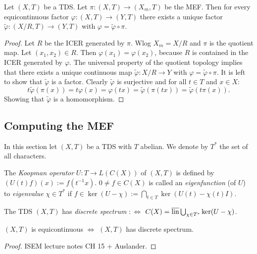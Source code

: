 \begin{proposition}
  Let $(X,T)$ be a TDS. Let $\pi : (X, T) \to  (X_m,T)$ be the MEF.
  Then for every equicontinuous factor $\varphi : (X,T) \to (Y,T)$ there exists a unique factor $\tilde{\varphi}: (X/R,T) \to (Y,T)$ with $\varphi = \tilde{\varphi} \circ \pi$.
\end{proposition}
\begin{proof}
  Let $R$ be the ICER generated by $\pi$.
  Wlog $X_m = X/R$ and $\pi$ is the quotient map.
  Let $(x_1, x_2) \in R$. Then $\varphi (x_1) = \varphi (x_2)$, because $R$ is contained in the ICER generated by $\varphi$.
  The universal property of the quotient topology implies that there exists a unique continuous map $\tilde{\varphi}: X/R \to Y$ with $\varphi = \tilde{\varphi}\circ \pi$.
  It is left to show that $\tilde{\varphi}$ is a factor.
  Clearly $\tilde{\varphi}$ is surjective and for all $t\in T$ and $x \in X$:
  \begin{equation*}
    t \tilde{\varphi} (\pi(x)) =  t \varphi (x) = \varphi (tx) = \tilde{\varphi}(\pi (tx)) = \tilde{\varphi}(t \pi (x)) .
  \end{equation*}
  Showing that $\tilde{\varphi}$ is a homomorphism.
\end{proof}
\subsection{Computing the MEF}
In this section let $(X,T)$ be a TDS with $T$ abelian.
We denote by $T^*$ the set of all characters.
\begin{definition}
  The \emph{Koopman operator} $U : T \to L(C(X))$ of $(X,T)$ is defined by $(U(t) f)(x) := f(t^{-1}x)$.
  $0 \neq f \in C(X)$ is called an \emph{eigenfunction} (of $U$) to \emph{eigenvalue} $\chi \in T^*$ if $f \in \ker (U-\chi):= \bigcap_{t \in T} \ker (U(t)- \chi (t)I)$.
\end{definition}
\begin{definition}
  The TDS $(X,T)$ has \emph{discrete spectrum} $:\Leftrightarrow $ $C(X) = \overline{\operatorname{lin}} \bigcup_{\chi \in T^*} \ker (U- \chi)$.
\end{definition}

\begin{theorem}
  \label{mef:thm:equiEQdiscrete}
  $(X,T)$ is equicontinuous $\Leftrightarrow$ $(X,T)$ has discrete spectrum.
\end{theorem}
\begin{proof}
  ISEM lecture notes CH 15 + Auslander.
\end{proof}

